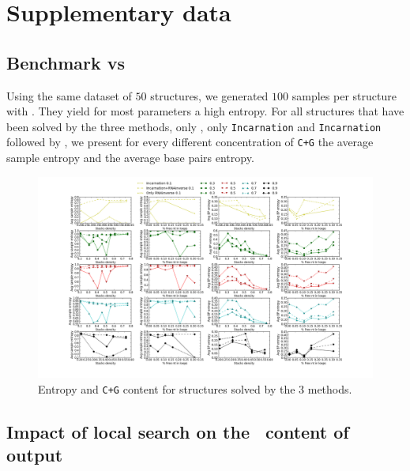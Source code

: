 \section{Supplementary data}
\subsection{Benchmark \ourprog vs \RNAinverse}
Using the same dataset of $50$ structures, we generated $100$ samples
per structure with \RNAinverse. They yield for most parameters
a high entropy. For all structures that have been solved 
by the three methods, only \RNAinverse, only \texttt{Incarnation} and
\texttt{Incarnation} followed by \RNAinverse,
we present for every different concentration of \texttt{C+G}
the average sample entropy and the average base pairs entropy.


\begin{figure}[ht!]
	\hspace{-5em}
	\includegraphics[scale=0.4]{Figures/RNAinverse_data_100.png}
	\caption{Entropy and \texttt{C+G} content for structures solved by
	the 3 methods.}
	\label{fig:rnainverse}
\end{figure}

%
\subsection{Impact of local search on the \gc~content of \ourprog output}

